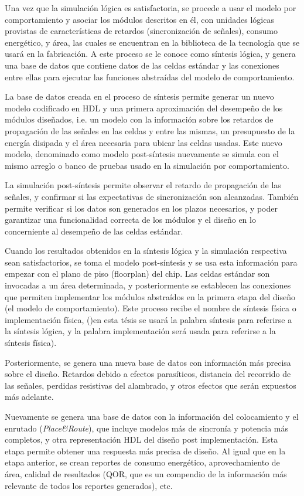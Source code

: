 Una vez que la simulación lógica es satisfactoria, se procede a usar el modelo por comportamiento y asociar los módulos descritos en él, con unidades lógicas provistas de características de retardos (sincronización de señales), consumo energético, y área, las cuales se encuentran en la biblioteca de la tecnología que se usará en la fabricación. A este proceso se le conoce como síntesis lógica, y genera una base de datos que contiene datos de las celdas estándar y las conexiones entre ellas para ejecutar las funciones abstraídas del modelo de comportamiento.

La base de datos creada en el proceso de síntesis permite generar un nuevo modelo codificado en HDL y una primera aproximación del desempeño de los módulos diseñados, i.e. un modelo con la información sobre los retardos de propagación de las señales en las celdas y entre las mismas, un presupuesto de la energía disipada y el área necesaria para ubicar las celdas usadas. Este nuevo modelo, denominado como modelo post-síntesis nuevamente se simula con el mismo arreglo o banco de pruebas usado en la simulación por comportamiento.

La simulación post-síntesis permite observar el retardo de propagación de las señales, y confirmar si las expectativas de sincronización son alcanzadas. También permite verificar si los datos son generados en los plazos necesarios, y poder garantizar una funcionalidad correcta de los módulos y el diseño en lo concerniente al desempeño de las celdas estándar. 

Cuando los resultados obtenidos en la síntesis lógica y la simulación respectiva sean satisfactorios, se toma el modelo post-síntesis y se usa esta información para empezar con el plano de piso (floorplan) del chip. Las celdas estándar son invocadas a un área determinada, y posteriormente se establecen las conexiones que permiten implementar los módulos abstraídos en la primera etapa del diseño (el modelo de comportamiento). Este proceso recibe el nombre de síntesis física o implementación física, ()en esta tésis se usará la palabra síntesis para referirse a la síntesis lógica, y la palabra implementación será usada para referirse a la síntesis física).

Posteriormente, se genera una nueva base de datos con información más precisa sobre el diseño. Retardos debido a efectos parasíticos, distancia del recorrido de las señales, perdidas resistivas del alambrado, y otros efectos que serán expuestos más adelante.

Nuevamente se genera una base de datos con la información del colocamiento y el enrutado (\textit{Place\&Route}), que incluye modelos más de sincronía y potencia más completos, y otra representación HDL del diseño post implementación. Esta etapa permite obtener una respuesta más precisa de diseño. Al igual que en la etapa anterior, se crean reportes de consumo energético, aprovechamiento de área, calidad de resultados (QOR, que es un compendio de la información más relevante de todos los reportes generados), etc.

